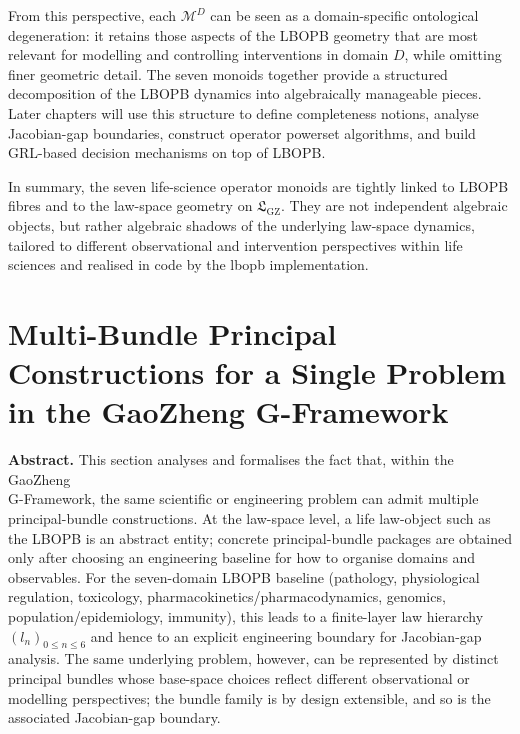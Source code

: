 \documentclass[11pt]{book}
\theoremstyle{plain}
\theoremstyle{definition}
\theoremstyle{remark}
\newcommand{\GZLS}{\ensuremath{\mathfrak{L}_{\mathrm{GZ}}}}       \newcommand{\GZLT}{\ensuremath{M_{!w}}}                           \newcommand{\GZLOC}{\ensuremath{A_M}}                             \newcommand{\GZLCurv}{\ensuremath{\mathcal{F}_{\mathrm{law}}}}
\begin{document}
From this perspective, each $\mathcal{M}^{D}$ can be seen as a
domain-specific ontological degeneration: it retains those aspects of
the LBOPB geometry that are most relevant for modelling and controlling
interventions in domain $D$, while omitting finer geometric detail.
The seven monoids together provide a structured decomposition of the
LBOPB dynamics into algebraically manageable pieces. Later chapters
will use this structure to define completeness notions, analyse
Jacobian-gap boundaries, construct operator powerset algorithms, and
build GRL-based decision mechanisms on top of LBOPB.

In summary, the seven life-science operator monoids are tightly linked
to LBOPB fibres and to the law-space geometry on $\GZLS$. They are not
independent algebraic objects, but rather algebraic shadows of the
underlying law-space dynamics, tailored to different observational and
intervention perspectives within life sciences and realised in code by
the lbopb implementation.

\section[Multi-Bundle Principal Constructions for a Single Problem]{Multi-Bundle Principal Constructions for a Single Problem\\
         in the GaoZheng G-Framework}
\label{sec:multi-bundle-LBOPB}



\noindent\textbf{Abstract.}
This section analyses and formalises the fact that, within the GaoZheng\\
G-Framework, the same scientific or engineering problem can admit
multiple principal-bundle constructions.
At the law-space level, a life law-object such as the LBOPB is an
abstract entity; concrete principal-bundle packages are obtained only
after choosing an engineering baseline for how to organise domains and
observables.
For the seven-domain LBOPB baseline (pathology, physiological
regulation, toxicology, pharmacokinetics/pharmacodynamics, genomics,
population/epidemiology, immunity), this leads to a finite-layer law
hierarchy $(l_n)_{0\le n\le 6}$ and hence to an explicit engineering
boundary for Jacobian-gap analysis.
The same underlying problem, however, can be represented by distinct
principal bundles whose base-space choices reflect different
observational or modelling perspectives; the bundle family is by design
extensible, and so is the associated Jacobian-gap boundary.
\end{document}
